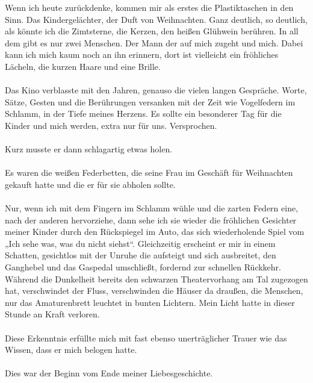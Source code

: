 Wenn ich heute zurückdenke, kommen  mir als erstes die Plastiktaschen in den Sinn. Das Kindergelächter, der Duft von Weihnachten. Ganz deutlich, so deutlich, als könnte ich die Zimtsterne, die Kerzen, den heißen Glühwein berühren. In all dem gibt es nur zwei Menschen. Der Mann der auf mich zugeht und mich. Dabei kann ich mich kaum noch an ihn erinnern, dort ist vielleicht ein fröhliches Lächeln, die kurzen Haare und eine Brille. \\\\
Das Kino verblasste mit den Jahren, genauso die vielen langen Gespräche. Worte, Sätze, Gesten und die Berührungen versanken mit der Zeit wie Vogelfedern im Schlamm, in der Tiefe meines Herzens. 
Es sollte ein besonderer Tag für die Kinder und mich werden, extra nur für uns. Versprochen.\\\\
Kurz musste er dann schlagartig etwas holen. \\\\
Es waren die weißen Federbetten, die seine Frau im Geschäft für Weihnachten gekauft hatte und die er für sie abholen sollte.\\\\
Nur, wenn ich mit dem Fingern im Schlamm wühle und die zarten Federn eine, nach der anderen hervorziehe, dann sehe ich sie wieder die fröhlichen Gesichter meiner Kinder durch den Rückspiegel im Auto, das sich wiederholende Spiel vom „Ich sehe was, was du nicht siehst“. Gleichzeitig erscheint er mir in einem Schatten, gesichtlos mit der Unruhe die aufsteigt und sich ausbreitet, den Ganghebel und das Gaspedal umschließt, fordernd zur schnellen Rückkehr. Während die Dunkelheit bereits den schwarzen Theatervorhang am Tal zugezogen hat, verschwindet der Fluss, verschwinden die Häuser da draußen, die Menschen, nur das Amaturenbrett leuchtet in bunten Lichtern. Mein Licht hatte in dieser Stunde an Kraft verloren. \\\\
Diese Erkenntnis erfüllte mich mit fast ebenso unerträglicher Trauer wie das Wissen, dass er mich belogen hatte.\\\\
Dies war der Beginn vom Ende meiner Liebesgeschichte.